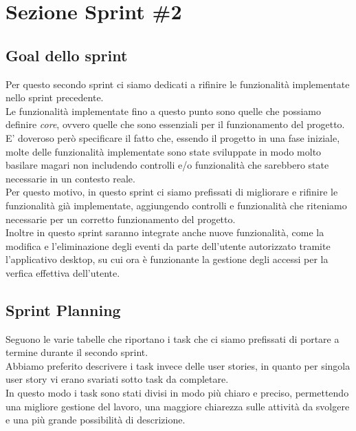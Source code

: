 \documentclass{article}
\begin{document}
\clearpage

\section{Sezione Sprint \#2}

\subsection{Goal dello sprint}

Per questo secondo sprint ci siamo dedicati a rifinire le funzionalità implementate nello sprint precedente.\\
Le funzionalità implementate fino a questo punto sono quelle che possiamo definire \textit{core}, ovvero quelle che sono essenziali per il funzionamento del progetto.\\
E' doveroso però specificare il fatto che, essendo il progetto in una fase iniziale, molte delle funzionalità implementate sono state sviluppate in modo molto basilare magari non includendo controlli e/o funzionalità che sarebbero state necessarie in un contesto reale.\\
Per questo motivo, in questo sprint ci siamo prefissati di migliorare e rifinire le funzionalità già implementate, aggiungendo controlli e funzionalità che riteniamo necessarie per un corretto funzionamento del progetto.\\

\noindent Inoltre in questo sprint saranno integrate anche nuove funzionalità, come la modifica e l'eliminazione degli eventi da parte dell'utente autorizzato tramite l'applicativo desktop, su cui ora è funzionante la gestione degli accessi per la verfica effettiva dell'utente.

\subsection{Sprint Planning}
Seguono le varie tabelle che riportano i task che ci siamo prefissati di portare a termine durante il secondo sprint.\\
Abbiamo preferito descrivere i task invece delle user stories, in quanto per singola user story vi erano svariati sotto task da completare.\\
In questo modo i task sono stati divisi in modo più chiaro e preciso, permettendo una migliore gestione del lavoro, una maggiore chiarezza sulle attività da svolgere e una più grande possibilità di descrizione.
\end{document}
